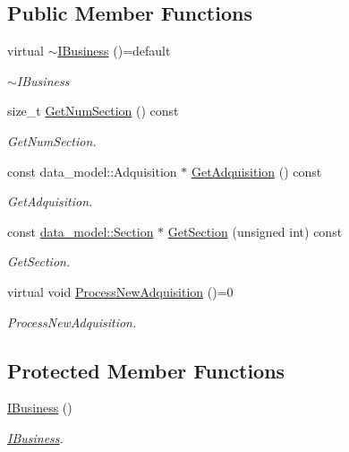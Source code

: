 \subsection*{Public Member Functions}
\begin{DoxyCompactItemize}
\item 
virtual \hyperlink{class_i_business_a228d92e5f27f5924815f2ba1191084fa}{$\sim$\+I\+Business} ()=default
\begin{DoxyCompactList}\small\item\em $\sim$\+I\+Business \end{DoxyCompactList}\item 
size\+\_\+t \hyperlink{class_i_business_a4df04231605372aac35aaf61f693514f}{Get\+Num\+Section} () const 
\begin{DoxyCompactList}\small\item\em Get\+Num\+Section. \end{DoxyCompactList}\item 
const data\+\_\+model\+::\+Adquisition $\ast$ \hyperlink{class_i_business_a02485d0c224a027b8c4e5f8f79f8bc60}{Get\+Adquisition} () const 
\begin{DoxyCompactList}\small\item\em Get\+Adquisition. \end{DoxyCompactList}\item 
const \hyperlink{classdata__model_1_1_section}{data\+\_\+model\+::\+Section} $\ast$ \hyperlink{class_i_business_ad6e3f210eba0c7517ade17f0d5a904ae}{Get\+Section} (unsigned int) const 
\begin{DoxyCompactList}\small\item\em Get\+Section. \end{DoxyCompactList}\item 
virtual void \hyperlink{class_i_business_a26e62b89d3d994dde2b0b528ee3ccf09}{Process\+New\+Adquisition} ()=0\hypertarget{class_i_business_a26e62b89d3d994dde2b0b528ee3ccf09}{}\label{class_i_business_a26e62b89d3d994dde2b0b528ee3ccf09}

\begin{DoxyCompactList}\small\item\em Process\+New\+Adquisition. \end{DoxyCompactList}\end{DoxyCompactItemize}
\subsection*{Protected Member Functions}
\begin{DoxyCompactItemize}
\item 
\hyperlink{class_i_business_ad8f2b5adfe83996565ea10b416c4f36e}{I\+Business} ()\hypertarget{class_i_business_ad8f2b5adfe83996565ea10b416c4f36e}{}\label{class_i_business_ad8f2b5adfe83996565ea10b416c4f36e}

\begin{DoxyCompactList}\small\item\em \hyperlink{class_i_business}{I\+Business}. \end{DoxyCompactList}\end{DoxyCompactItemize}
